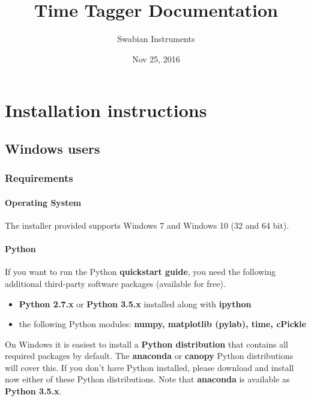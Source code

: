 \documentclass[letterpaper,10pt,english]{sphinxmanual}
\title{Time Tagger Documentation}
\date{Nov 25, 2016}
\author{Swabian Instruments}
\begin{document}
\maketitle
\tableofcontents
{}\label{index::doc}



\chapter{Installation instructions}
\label{sections/installation:welcome-to-time-tagger-s-documentation}\label{sections/installation::doc}\label{sections/installation:installation-instructions}

\section{Windows users}
\label{sections/installation:windows-users}

\subsection{Requirements}
\label{sections/installation:requirements}

\subsubsection{Operating System}
\label{sections/installation:operating-system}
The installer provided supports Windows 7 and Windows 10 (32 and 64 bit).


\subsubsection{Python}
\label{sections/installation:python}
If you want to run the Python \textbf{quickstart guide}, you need the following additional third-party software packages (available for free).
\begin{itemize}
\item {} 
\textbf{Python 2.7.x} or \textbf{Python 3.5.x} installed along with \textbf{ipython}

\item {} 
the following Python modules: \textbf{numpy, matplotlib (pylab), time, cPickle}

\end{itemize}

On Windows it is easiest to install a \textbf{Python distribution} that contains all required
packages by default. The \textbf{anaconda} or \textbf{canopy} Python distributions will cover this.
If you don't have Python installed, please download and install now either
of these Python distributions. Note that \textbf{anaconda} is available as \textbf{Python 3.5.x}.
\end{document}
